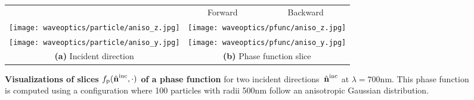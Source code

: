 \begin{figure}[!ht]
    \centering
    \setlength{\resLen}{1.5in}
    \addtolength{\tabcolsep}{3pt}
    \begin{tabular}{ccc}
        & Forward & Backward\\
        \texttt{[image: waveoptics/particle/aniso\_z.jpg]}
        & \multicolumn{2}{c}{\texttt{[image: waveoptics/pfunc/aniso\_z.jpg]}}
        \\
        \texttt{[image: waveoptics/particle/aniso\_y.jpg]}
        & \multicolumn{2}{c}{\texttt{[image: waveoptics/pfunc/aniso\_y.jpg]}}
        \\
        \textbf{(a)} Incident direction & \multicolumn{2}{c}{\textbf{(b)} Phase function slice}
    \end{tabular}
    \caption[Visualizations of phase function]{\label{fig:waveoptics:aniso1}
        \textbf{Visualizations of slices $f_\mathrm{p}({\hat{\mathbf{n}}}^\mathrm{inc},\cdot)$ of a phase function} for two incident directions~${\hat{\mathbf{n}}}^\mathrm{inc}$ at $\lambda = 700\text{nm}$.
        This phase function is computed using a configuration where 100 particles with radii 500nm follow an anisotropic Gaussian distribution.
    }
\end{figure}
